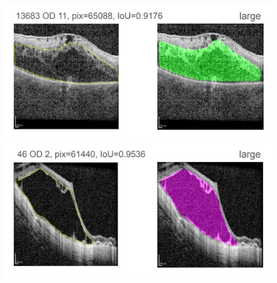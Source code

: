 \includegraphics[width=0.9\textwidth]{./pic/Segmentierung/Segmentierungsergebnisse/49.PNG}
\includegraphics[width=0.9\textwidth]{./pic/Segmentierung/Segmentierungsergebnisse/50.PNG}